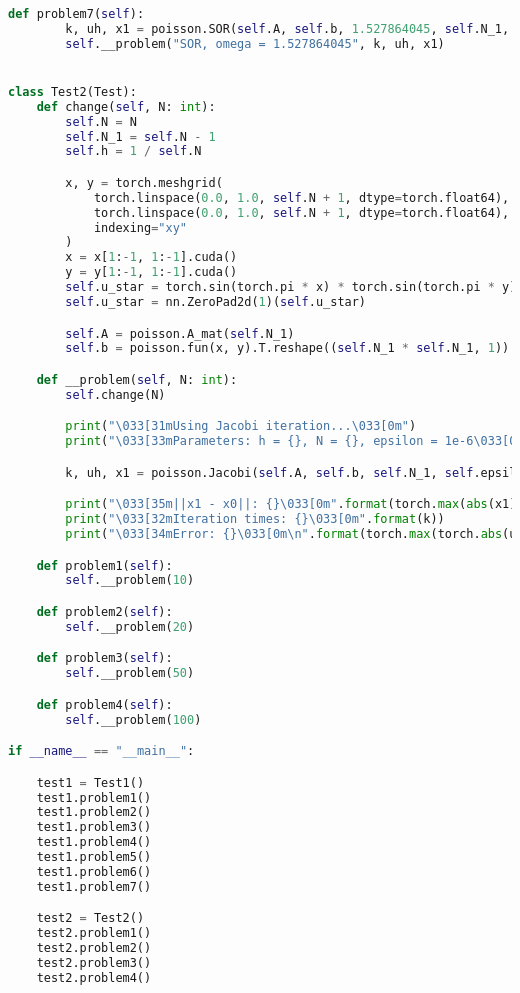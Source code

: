 \documentclass{article}
\begin{document}
\begin{lstlisting}[language=Python]
    def problem7(self):
        k, uh, x1 = poisson.SOR(self.A, self.b, 1.527864045, self.N_1, self.epsilon)
        self.__problem("SOR, omega = 1.527864045", k, uh, x1)


class Test2(Test):
    def change(self, N: int):
        self.N = N
        self.N_1 = self.N - 1
        self.h = 1 / self.N

        x, y = torch.meshgrid(
            torch.linspace(0.0, 1.0, self.N + 1, dtype=torch.float64),
            torch.linspace(0.0, 1.0, self.N + 1, dtype=torch.float64),
            indexing="xy"
        )
        x = x[1:-1, 1:-1].cuda()
        y = y[1:-1, 1:-1].cuda()
        self.u_star = torch.sin(torch.pi * x) * torch.sin(torch.pi * y)
        self.u_star = nn.ZeroPad2d(1)(self.u_star)

        self.A = poisson.A_mat(self.N_1)
        self.b = poisson.fun(x, y).T.reshape((self.N_1 * self.N_1, 1)) * self.h ** 2

    def __problem(self, N: int):
        self.change(N)

        print("\033[31mUsing Jacobi iteration...\033[0m")
        print("\033[33mParameters: h = {}, N = {}, epsilon = 1e-6\033[0m".format(self.h, self.N))

        k, uh, x1 = poisson.Jacobi(self.A, self.b, self.N_1, self.epsilon)

        print("\033[35m||x1 - x0||: {}\033[0m".format(torch.max(abs(x1))))
        print("\033[32mIteration times: {}\033[0m".format(k))
        print("\033[34mError: {}\033[0m\n".format(torch.max(torch.abs(uh - self.u_star))))

    def problem1(self):
        self.__problem(10)

    def problem2(self):
        self.__problem(20)

    def problem3(self):
        self.__problem(50)

    def problem4(self):
        self.__problem(100)

if __name__ == "__main__":

    test1 = Test1()
    test1.problem1()
    test1.problem2()
    test1.problem3()
    test1.problem4()
    test1.problem5()
    test1.problem6()
    test1.problem7()

    test2 = Test2()
    test2.problem1()
    test2.problem2()
    test2.problem3()
    test2.problem4()
\end{lstlisting}
\end{document}
